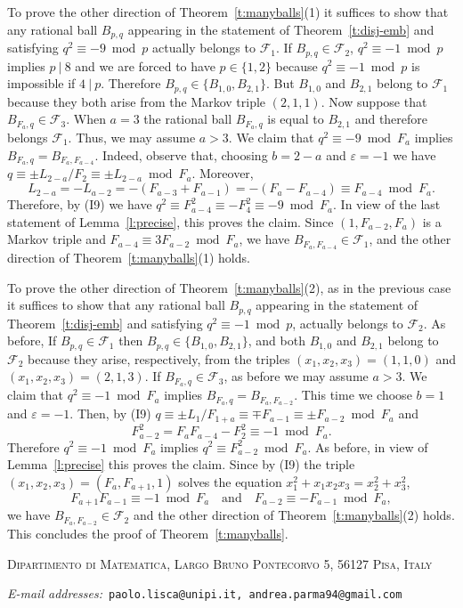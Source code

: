 \documentclass[11pt,a4paper]{amsart}
\makeatletter
\newcommand{\F}{\mathcal F}
\newcommand{\ep}{\varepsilon}
\theoremstyle{definition}
\numberwithin{equation}{section}
\newcommand{\Addresses}{{%
		\bigskip
		\footnotesize
		
		\textsc{Dipartimento di Matematica, Largo Bruno Pontecorvo 5, 56127 Pisa, Italy}\par\nopagebreak
		\textit{E-mail addresses:}\ \texttt{paolo.lisca@unipi.it, andrea.parma94@gmail.com}
}}
\makeatother
\begin{document}
To prove the other direction of Theorem~\ref{t:manyballs}(1) it suffices to show that any rational ball $B_{p,q}$ appearing in the statement of Theorem~\ref{t:disj-emb} and satisfying $q^2\equiv -9\bmod p$ actually belongs to $\F_1$. 
If $B_{p,q}\in\F_2$, $q^2\equiv -1\bmod p$ implies $p\ |\ 8$ and we are forced to have $p \in \{1,2\}$ because $q^2\equiv -1\bmod p$ is impossible if $4\ |\ p$. 
Therefore $B_{p,q} \in \{ B_{1,0},B_{2,1} \}$. But $B_{1,0}$ and $B_{2,1}$ belong to $\F_1$ because they both arise from the Markov triple $(2,1,1)$. 
Now suppose that $B_{F_a,q}\in\F_3$. When $a = 3$ the rational ball $B_{F_a,q}$ is equal to $B_{2,1}$ and 
therefore belongs $\F_1$. Thus, we may assume $a>3$. We claim 
that $q^2\equiv -9\bmod F_a$ implies $B_{F_a,q} = B_{F_a,F_{a-4}}$. 
Indeed, observe that, choosing $b=2-a$ and $\ep=-1$ we have 
$q\equiv\pm L_{2-a}/F_2\equiv\pm L_{2-a}\bmod F_a$. Moreover, 
\[
L_{2-a} = -L_{a-2} = - (F_{a-3} + F_{a-1}) = - (F_a - F_{a-4}) \equiv F_{a-4}\bmod F_a. 
\]
Therefore, by (I9) we have $q^2\equiv F_{a-4}^2 \equiv -F_4^2 \equiv -9 \bmod F_a$. 
In view of the last statement of Lemma~\ref{l:precise}, this proves the claim. Since 
$(1,F_{a-2},F_a)$ is a Markov triple and $F_{a-4}\equiv 3F_{a - 2}\bmod F_a$, 
we have $B_{F_a,F_{a-4}}\in\F_1$, and the other direction of Theorem~\ref{t:manyballs}(1) holds. 

To prove the other direction of Theorem~\ref{t:manyballs}(2), as in the previous case it suffices to show that 
any rational ball $B_{p,q}$ appearing in the statement of Theorem~\ref{t:disj-emb} and 
satisfying $q^2\equiv -1\bmod p$, actually belongs to $\F_2$. 
As before, If $B_{p,q}\in\F_1$ then $B_{p,q} \in \{B_{1,0},B_{2,1}\}$, and both $B_{1,0}$ and $B_{2,1}$ belong to $\F_2$ 
because they arise, respectively, from the triples $(x_1,x_2,x_3) = (1,1,0)$ and $(x_1,x_2,x_3) = (2,1,3)$. If $B_{F_a,q}\in\F_3$, 
as before we may assume $a>3$. 
We claim that $q^2\equiv -1\bmod F_a$ implies $B_{F_a,q} = B_{F_a,F_{a-2}}$. 
This time we choose $b=1$ and $\ep=-1$. 
Then, by (I9) $q\equiv\pm L_1/F_{1+a}\equiv\mp F_{a-1}\equiv\pm F_{a-2} \bmod F_a$ and 
\[
F_{a-2}^2 = F_a F_{a-4} - F_2^2 \equiv -1\bmod F_a. 
\]
Therefore $q^2\equiv -1\bmod F_a$ implies $q^2 \equiv F_{a-2}^2\bmod F_a$. 
As before, in view of Lemma~\ref{l:precise} this proves the claim. 
Since by (I9) the triple $(x_1,x_2,x_3) = (F_a,F_{a+1},1)$ solves the 
equation $x_1^2+ x_1 x_2 x_3 = x_2^2+x_3^2$, 
\[
F_{a+1} F_{a-1} \equiv -1\bmod F_a\quad\text{and}\quad 
F_{a-2}\equiv -F_{a-1}\bmod F_a,
\]
we have $B_{F_a,F_{a-2}}\in\F_2$ and the 
other direction of Theorem~\ref{t:manyballs}(2) holds. This concludes the proof of Theorem~\ref{t:manyballs}.

\printbibliography
\Addresses
\end{document}
